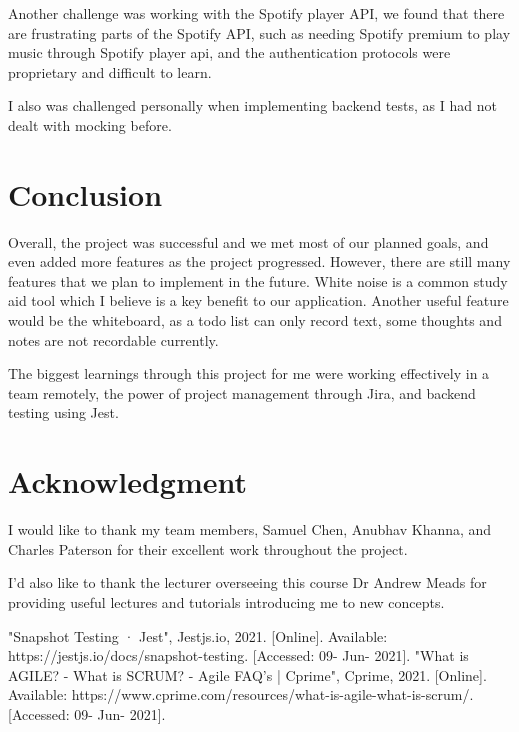 \documentclass[conference]{IEEEtran}
\begin{document}
Another challenge was working with the Spotify player API, we found that there are frustrating parts of the Spotify API, such as needing Spotify premium to play music through Spotify player api, and the authentication protocols were proprietary and difficult to learn.

I also was challenged personally when implementing backend tests, as I had not dealt with mocking before.

\section{Conclusion}
Overall, the project was successful and we met most of our planned goals, and even added more features as the project progressed. However, there are still many features that we plan to implement in the future. White noise is a common study aid tool which I believe is a key benefit to our application. Another useful feature would be the whiteboard, as a todo list can only record text, some thoughts and notes are not recordable currently.

The biggest learnings through this project for me were working effectively in a team remotely, the power of project management through Jira, and backend testing using Jest.

\section*{Acknowledgment}
I would like to thank my team members, Samuel Chen, Anubhav Khanna, and Charles Paterson for their excellent work throughout the project.

I'd also like to thank the lecturer overseeing this course Dr Andrew Meads for providing useful lectures and tutorials introducing me to new concepts.

\begin{thebibliography}{00}
"Snapshot Testing · Jest", Jestjs.io, 2021. [Online]. Available: https://jestjs.io/docs/snapshot-testing. [Accessed: 09- Jun- 2021].
"What is AGILE? - What is SCRUM? - Agile FAQ's | Cprime", Cprime, 2021. [Online]. Available: https://www.cprime.com/resources/what-is-agile-what-is-scrum/. [Accessed: 09- Jun- 2021].
\end{thebibliography}
\end{document}
